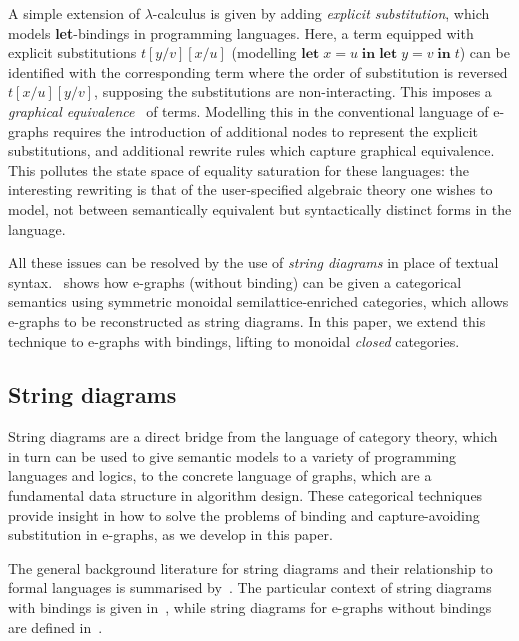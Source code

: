 A simple extension of $\lambda$-calculus is given by adding \emph{explicit substitution}, which models \textbf{let}-bindings in programming languages.
Here, a term equipped with explicit substitutions $t[y/v][x/u]$ (modelling $\textbf{let} \; x = u \; \textbf{in} \; \textbf{let} \; y = v \; \textbf{in} \; t$) can be identified with the corresponding term where the order of substitution is reversed $t[x/u][y/v]$, supposing the substitutions are non-interacting.
This imposes a \emph{graphical equivalence}~\cite{accattoli2014nonstandard} of terms.
Modelling this in the conventional language of e-graphs requires the introduction of additional nodes to represent the explicit substitutions, and additional rewrite rules which capture graphical equivalence.
This pollutes the state space of equality saturation for these languages: the interesting rewriting is that of the user-specified algebraic theory one wishes to model, not between semantically equivalent but syntactically distinct forms in the language.

All these issues can be resolved by the use of \emph{string diagrams} in place of textual syntax.
\citet{ghica2024equivalencehypergraphsegraphsmonoidal}~shows how e-graphs (without binding) can be given a categorical semantics using symmetric monoidal semilattice-enriched categories, which allows e-graphs to be reconstructed as string diagrams.
In this paper, we extend this technique to e-graphs with bindings, lifting to monoidal \emph{closed} categories.

\subsection{String diagrams}

String diagrams are a direct bridge from the language of category theory, which in turn can be used to give semantic models to a variety of programming languages and logics, to the concrete language of graphs, which are a fundamental data structure in algorithm design.
These categorical techniques provide insight in how to solve the problems of binding and capture-avoiding substitution in e-graphs, as we develop in this paper.

The general background literature for string diagrams and their relationship to formal languages is summarised by~\citet{piedeleu2023introductionstringdiagramscomputer}.
The particular context of string diagrams with bindings is given in~\citet{ghica2024stringdiagramslambdacalculifunctional}, while string diagrams for e-graphs without bindings are defined in~\citet{ghica2024equivalencehypergraphsegraphsmonoidal}.


